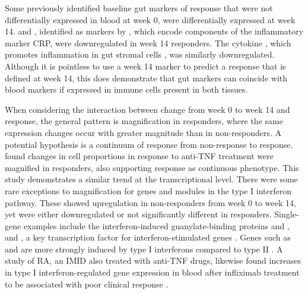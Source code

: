 Some previously identified baseline gut markers of response that were not differentially expressed in blood at week 0, were differentially expressed at week 14.
 and , identified as markers by \textcite{arijs2010PredictiveValueEpithelial}, which encode components of the inflammatory marker \gls{CRP}, were downregulated in week 14 responders.
The cytokine , which promotes inflammation in gut stromal cells \autocite{west2017OncostatinDrivesIntestinal}, was similarly downregulated.
Although it is pointless to use a week 14 marker to predict a response that is defined at week 14,
this does demonstrate that gut markers can coincide with blood markers if expressed in immune cells present in both tissues.

%
When considering the interaction between change from week 0 to week 14 and response,
the general pattern is magnification in responders,
where the same expression changes occur with greater magnitude than in non-responders.
A potential hypothesis is a continuum of response from non-response to response.
\textcite{gaujoux2019CellcentredMetaanalysisReveals} found changes in cell proportions in response to anti-\gls{TNF} treatment were magnified in responders, 
also supporting response as continuous phenotype.
This study demonstrates a similar trend at the transcriptional level.
%
There were some rare exceptions to magnification for genes and modules in the type I interferon pathway.
These showed upregulation in non-responders from week 0 to week 14,
yet were either downregulated or not significantly different in responders.
Single-gene examples include the interferon-induced guanylate-binding proteins  and  \autocite{tretina2019InterferoninducedGuanylatebindingProteins}, 
and , a key transcription factor for interferon-stimulated genes \autocite{schneider2014InterferonStimulatedGenesComplex}.
Genes such as  and  are more strongly induced by type I interferons compared to type II \autocite{liu2012SystematicIdentificationType}.
A study of \gls{RA},
an \gls{IMID} also treated with anti-\gls{TNF} drugs,
likewise found increases in type I interferon-regulated gene expression in blood after infliximab treatment to be associated with poor clinical response \autocite{vanbaarsen2010RegulationIFNResponse}.

